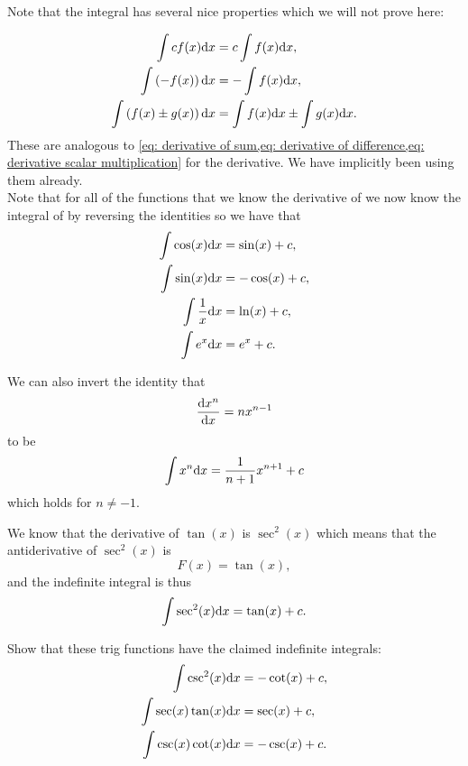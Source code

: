 Note that the integral has several nice properties which we will not prove here:

\begin{align}
\int c f(x) \mathrm{d} x &= c\int f(x) \mathrm{d} x, \label{eq: integral scalar multiplication}\\
\int \left(-f(x)\right)\mathrm{d} x&=-\int f(x)\mathrm{d} x, \\
\int \left(f(x)\pm g(x)\right)\mathrm{d} x &=\int f(x)\mathrm{d} x \pm \int g(x)\mathrm{d} x. \label{eq: integral of sum}
\end{align}
These are analogous to \cref{eq: derivative of sum,eq: derivative of difference,eq: derivative scalar multiplication} for the derivative. We have implicitly been using them already.\\

Note that for all of the functions that we know the derivative of we now know the integral of by reversing the identities so we have that
\begin{align*}
\int\cos(x)\mathrm{d} x &=\sin(x) +c,\\
\int \sin(x) \mathrm{d} x &=-\cos(x)+c,\\
\int \frac{1}{x}\mathrm{d} x &=\ln(x) +c,\\
\int e^{x}\mathrm{d} x &=e^{x}+c.
\end{align*}

We can also invert the identity that 
\begin{equation*}
\frac{\mathrm{d} x^{n}}{\mathrm{d} x}=nx^{n-1}
\end{equation*}
to be
\begin{equation}
\int x^{n}\mathrm{d} x =\frac{1}{n+1}x^{n+1} +c
\label{eq: integral of monomial}
\end{equation}
which holds for $n\neq -1$.
\begin{ex}
We know that the derivative of $\tan(x)$ is $\sec^{2}(x)$ which means that the antiderivative of $\sec^{2}(x)$ is
\begin{equation*}
F(x)=\tan(x),
\end{equation*}
and the indefinite integral is thus
\begin{equation*}
\int \sec^{2}(x)\mathrm{d} x = \tan(x)+c.
\end{equation*}
\end{ex}

\begin{exercise}
Show that these trig functions have the claimed indefinite integrals:
\begin{align*}
\int \csc^{2}(x)\mathrm{d} x &=-\cot(x) +c,\\
\int \sec(x)\tan(x)\mathrm{d} x &=\sec(x) +c,\\
\int \csc(x)\cot(x)\mathrm{d} x &=-\csc(x) +c.
\end{align*}
\end{exercise}

